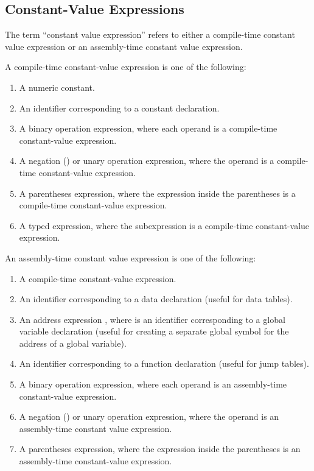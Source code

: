\documentclass[10pt]{article}
\begin{document}
\subsection{Constant-Value Expressions}
\label{sec:semantics:constant-value-expr}

The term ``constant value expression'' refers to either a compile-time
constant value expression or an assembly-time constant value
expression.

 A compile-time
constant-value expression is one of the following:
%
\begin{enumerate}
%
\item A numeric constant.
%
\item An identifier corresponding to a constant declaration.
%
\item A binary operation expression, where each operand is a
  compile-time constant-value expression.
%
\item A negation (\kwd{-}) or  unary operation expression,
  where the operand is a compile-time constant-value expression.
%
\item A parentheses expression, where the expression inside the
  parentheses is a compile-time constant-value expression.
%
\item A typed expression, where the subexpression is a compile-time
  constant-value expression.
%
\end{enumerate}

 An assembly-time
constant value expression is one of the following:
%
\begin{enumerate}
%
\item A compile-time constant-value expression.
%
\item An identifier corresponding to a data declaration (useful for
  data tables).
%
\item An address expression , where
   is an identifier corresponding to a global
  variable declaration (useful for creating a separate global symbol
  for the address of a global variable).
%
\item An identifier corresponding to a function declaration (useful
  for jump tables).
%
\item A binary operation expression, where each operand is an
  assembly-time constant-value expression.
%
\item A negation (\kwd{-}) or  unary operation expression,
  where the operand is an assembly-time constant value expression.
%
\item A parentheses expression, where the expression inside the
  parentheses is an assembly-time constant-value expression.
%
\end{enumerate}
\end{document}
